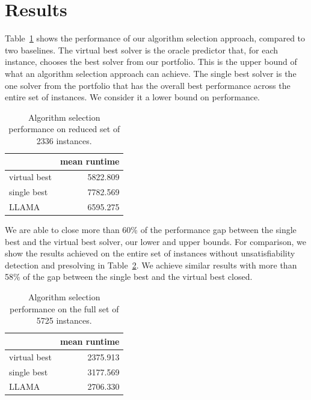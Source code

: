 \documentclass{llncs}
\begin{document}
\section{Results}

Table~\ref{tab:res} shows the performance of our algorithm selection approach,
compared to two baselines. The virtual best solver is the oracle predictor that,
for each instance, chooses the best solver from our portfolio. This is the upper
bound of what an algorithm selection approach can achieve. The single best
solver is the one solver from the portfolio that has the overall best
performance across the entire set of instances. We consider it a lower bound on
performance.

\begin{table}[ht]
\centering
\begin{tabular}{lr}
  \toprule
& mean runtime\\
  \midrule
virtual best & 5822.809\\
  single best & 7782.569\\
  LLAMA & 6595.275\\
   \bottomrule
\end{tabular}
\vspace{1ex}
\caption{Algorithm selection performance on reduced set of 2336
instances.}\label{tab:res}
\end{table}

We are able to close more than 60\% of the performance gap between the single
best and the virtual best solver, our lower and upper bounds. For comparison, we
show the results achieved on the entire set of instances without
unsatisfiability detection and presolving in Table~\ref{tab:resfull}. We achieve
similar results with more than 58\% of the gap between the single best and the
virtual best closed.

\begin{table}[ht]
\centering
\begin{tabular}{lr}
  \toprule
& mean runtime\\
  \midrule
virtual best & 2375.913\\
  single best & 3177.569\\
  LLAMA & 2706.330\\
   \bottomrule
\end{tabular}
\vspace{1ex}
\caption{Algorithm selection performance on the full set of 5725
instances.}\label{tab:resfull}
\end{table}
\end{document}
